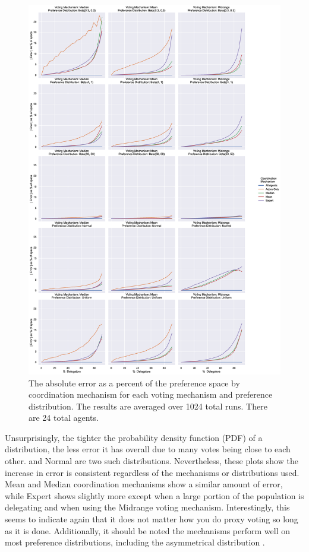 \begin{figure}[p]
    \centering
    \includegraphics[scale=0.35]
    {content/chapter2/figures/distribution_error_as_percent_of_space_abs_mean}
    \caption{
        The absolute error as a percent of the preference space by coordination
        mechanism for each voting mechanism and preference distribution.
        The results are averaged over 1024 total runs.
        There are 24 total agents.
    }
    \label{fig:distribution-error-as-percent-of-space-abs-mean}
\end{figure}

Unsurprisingly, the tighter the probability density function (PDF) of a distribution,
the less error it has overall due to many votes being close to each other.
 and Normal are two such distributions.
Nevertheless, these plots show the increase in error is consistent regardless of the
mechanisms or distributions used.
Mean and Median coordination mechanisms show a similar amount of error, while Expert
shows slightly more except when a large portion of the population is delegating and
when using the Midrange voting mechanism.
Interestingly, this seems to indicate again that it does not matter how you do proxy
voting so long as it is done.
Additionally, it should be noted the mechanisms perform well on most preference
distributions, including the asymmetrical distribution .

